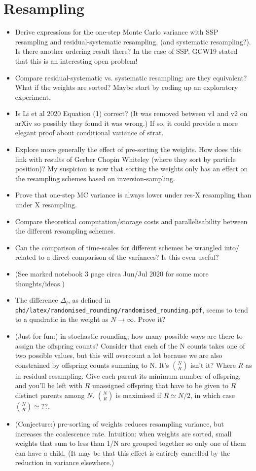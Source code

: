 \documentclass{article}
\begin{document}
\section*{Resampling}
\begin{itemize}
\item Derive expressions for the one-step Monte Carlo variance with SSP resampling and residual-systematic resampling, (and systematic resampling?). Is there another ordering result there? In the case of SSP, GCW19 stated that this is an interesting open problem!
\item Compare residual-systematic vs. systematic resampling: are they equivalent? What if the weights are sorted? Maybe start by coding up an exploratory experiment.
\item Is Li et al 2020 Equation (1) correct? (It was removed between v1 and v2 on arXiv so possibly they found it was wrong.) If so, it could provide a more elegant proof about conditional variance of strat.
\item Explore more generally the effect of pre-sorting the weights. How does this link with results of Gerber Chopin Whiteley (where they sort by particle position)? My suspicion is now that sorting the weights only has an effect on the resampling schemes based on inversion-sampling.
\item Prove that one-step MC variance is always lower under res-X resampling than under X resampling.
\item Compare theoretical computation/storage costs and parallelisability between the different resampling schemes.
\item Can the comparison of time-scales for different schemes be wrangled into/ related to a direct comparison of the variances? Is this even useful?
\item (See marked notebook 3 page circa Jun/Jul 2020 for some more thoughts/ideas.)
\item The difference $\Delta_i$, as defined in \texttt{phd/latex/randomised\_rounding/randomised\_rounding.pdf}, seems to tend to a quadratic in the weight as $N\to\infty$. Prove it?
\item (Just for fun:) in stochastic rounding, how many possible ways are there to assign the offspring counts? Consider that each of the N counts takes one of two possible values, but this will overcount a lot because we are also constrained by offspring counts summing to N. It's $\binom{N}{R}$ isn't it? Where $R$ as in residual resampling. Give each parent its minimum number of offspring, and you'll be left with $R$ unassigned offspring that have to be given to $R$ distinct parents among $N$. $\binom{N}{R}$ is maximised if $R\simeq N/2$, in which case $\binom{N}{R}\simeq ??$.
\item (Conjecture:) pre-sorting of weights reduces resampling variance, but increases the coalescence rate. Intuition: when weights are sorted, small weights that sum to less than 1/N are grouped together so only one of them can have a child. (It may be that this effect is entirely cancelled by the reduction in variance elsewhere.)
\end{itemize}
\end{document}
